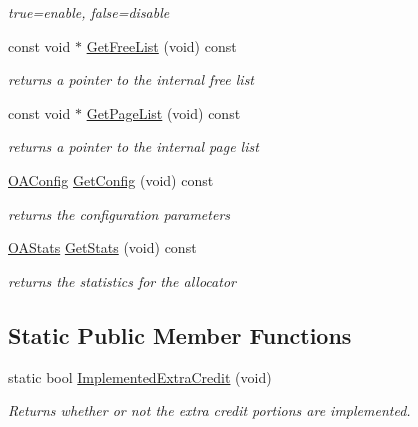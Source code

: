 \begin{DoxyCompactItemize}
\begin{DoxyCompactList}\small\item\em true=enable, false=disable \end{DoxyCompactList}\item 
\hypertarget{classObjectAllocator_a17b005cd19c2a298a1040cc781b74fb4}{const void $\ast$ \hyperlink{classObjectAllocator_a17b005cd19c2a298a1040cc781b74fb4}{Get\-Free\-List} (void) const }\label{classObjectAllocator_a17b005cd19c2a298a1040cc781b74fb4}

\begin{DoxyCompactList}\small\item\em returns a pointer to the internal free list \end{DoxyCompactList}\item 
const void $\ast$ \hyperlink{classObjectAllocator_a15f86d201856ee1b42d0821e6ba2b2d3}{Get\-Page\-List} (void) const 
\begin{DoxyCompactList}\small\item\em returns a pointer to the internal page list \end{DoxyCompactList}\item 
\hyperlink{structOAConfig}{O\-A\-Config} \hyperlink{classObjectAllocator_ac662e8a5094e33423f3210962aa3f8e6}{Get\-Config} (void) const 
\begin{DoxyCompactList}\small\item\em returns the configuration parameters \end{DoxyCompactList}\item 
\hyperlink{structOAStats}{O\-A\-Stats} \hyperlink{classObjectAllocator_a40fd74c78e2712e3b85be0868309fbb3}{Get\-Stats} (void) const 
\begin{DoxyCompactList}\small\item\em returns the statistics for the allocator \end{DoxyCompactList}\end{DoxyCompactItemize}
\subsection*{Static Public Member Functions}
\begin{DoxyCompactItemize}
\item 
static bool \hyperlink{classObjectAllocator_ad1780fd354ced99e57eb79ee719b95b6}{Implemented\-Extra\-Credit} (void)
\begin{DoxyCompactList}\small\item\em Returns whether or not the extra credit portions are implemented. \end{DoxyCompactList}\end{DoxyCompactItemize}
